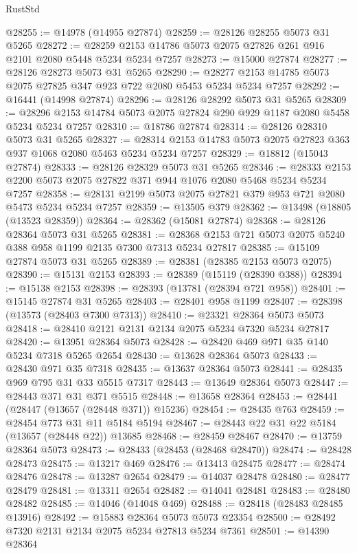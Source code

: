\begin{lexlean}{RustStd}
\begin{coremodule}
@28255 := @14978 (@14955 @27874)
@28259 := @28126 @28255 @5073 @31 @5265
@28272 := @28259 @2153 @14786 @5073 @2075 @27826 @261 @916 @2101 @2080 @5448 @5234 @5234 @7257
@28273 := @15000 @27874
@28277 := @28126 @28273 @5073 @31 @5265
@28290 := @28277 @2153 @14785 @5073 @2075 @27825 @347 @923 @722 @2080 @5453 @5234 @5234 @7257
@28292 := @16441 (@14998 @27874)
@28296 := @28126 @28292 @5073 @31 @5265
@28309 := @28296 @2153 @14784 @5073 @2075 @27824 @290 @929 @1187 @2080 @5458 @5234 @5234 @7257
@28310 := @18786 @27874
@28314 := @28126 @28310 @5073 @31 @5265
@28327 := @28314 @2153 @14783 @5073 @2075 @27823 @363 @937 @1068 @2080 @5463 @5234 @5234 @7257
@28329 := @18812 (@15043 @27874)
@28333 := @28126 @28329 @5073 @31 @5265
@28346 := @28333 @2153 @2200 @5073 @2075 @27822 @371 @944 @1076 @2080 @5468 @5234 @5234 @7257
@28358 := @28131 @2199 @5073 @2075 @27821 @379 @953 @721 @2080 @5473 @5234 @5234 @7257
@28359 := @13505 @379
@28362 := @13498 (@18805 (@13523 @28359))
@28364 := @28362 (@15081 @27874)
@28368 := @28126 @28364 @5073 @31 @5265
@28381 := @28368 @2153 @721 @5073 @2075 @5240 @388 @958 @1199 @2135 @7300 @7313 @5234 @27817
@28385 := @15109 @27874 @5073 @31 @5265
@28389 := @28381 (@28385 @2153 @5073 @2075)
@28390 := @15131 @2153
@28393 := @28389 (@15119 (@28390 @388))
@28394 := @15138 @2153
@28398 := @28393 (@13781 (@28394 @721 @958))
@28401 := @15145 @27874 @31 @5265
@28403 := @28401 @958 @1199
@28407 := @28398 (@13573 (@28403 @7300 @7313))
@28410 := @23321 @28364 @5073 @5073
@28418 := @28410 @2121 @2131 @2134 @2075 @5234 @7320 @5234 @27817
@28420 := @13951 @28364 @5073
@28428 := @28420 @469 @971 @35 @140 @5234 @7318 @5265 @2654
@28430 := @13628 @28364 @5073
@28433 := @28430 @971 @35 @7318
@28435 := @13637 @28364 @5073
@28441 := @28435 @969 @795 @31 @33 @5515 @7317
@28443 := @13649 @28364 @5073
@28447 := @28443 @371 @31 @371 @5515
@28448 := @13658 @28364
@28453 := @28441 (@28447 (@13657 (@28448 @371)) @15236)
@28454 := @28435 @763
@28459 := @28454 @773 @31 @11 @5184 @5194
@28467 := @28443 @22 @31 @22 @5184 (@13657 (@28448 @22)) @13685
@28468 := @28459 @28467
@28470 := @13759 @28364 @5073
@28473 := @28433 (@28453 (@28468 @28470))
@28474 := @28428 @28473
@28475 := @13217 @469
@28476 := @13413 @28475
@28477 := @28474 @28476
@28478 := @13287 @2654
@28479 := @14037 @28478
@28480 := @28477 @28479
@28481 := @13311 @2654
@28482 := @14041 @28481
@28483 := @28480 @28482
@28485 := @14046 (@14048 @469)
@28488 := @28418 (@28483 @28485 @13916)
@28492 := @15883 @28364 @5073 @5073 @23354
@28500 := @28492 @7320 @2131 @2134 @2075 @5234 @27813 @5234 @7361
@28501 := @14390 @28364

\end{coremodule}
\end{lexlean}
